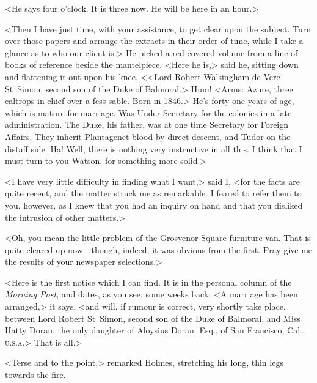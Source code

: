 <He says four o'clock. It is three now. He will be here in an hour.>

<Then I have just time, with your assistance, to get clear upon the subject. Turn over those papers and arrange the extracts in their order of time, while I take a glance as to who our client is.> He picked a red-covered volume from a line of books of reference beside the mantelpiece. <Here he is,> said he, sitting down and flattening it out upon his knee. <<Lord Robert Walsingham de Vere St~Simon, second son of the Duke of Balmoral.> Hum! <Arms: Azure, three caltrops in chief over a fess sable. Born in 1846.> He's forty-one years of age, which is mature for marriage. Was Under-Secretary for the colonies in a late administration. The Duke, his father, was at one time Secretary for Foreign Affairs. They inherit Plantagenet blood by direct descent, and Tudor on the distaff side. Ha! Well, there is nothing very instructive in all this. I think that I must turn to you Watson, for something more solid.>

<I have very little difficulty in finding what I want,> said I, <for the facts are quite recent, and the matter struck me as remarkable. I feared to refer them to you, however, as I knew that you had an inquiry on hand and that you disliked the intrusion of other matters.>

<Oh, you mean the little problem of the Grosvenor Square furniture van. That is quite cleared up now—though, indeed, it was obvious from the first. Pray give me the results of your newspaper selections.>

<Here is the first notice which I can find. It is in the personal column of the \textit{Morning Post}, and dates, as you see, some weeks back: <A marriage has been arranged,> it says, <and will, if rumour is correct, very shortly take place, between Lord Robert St~Simon, second son of the Duke of Balmoral, and Miss Hatty Doran, the only daughter of Aloysius Doran. Esq., of San Francisco, Cal., \textsc{u.s.a.}> That is all.>

<Terse and to the point,> remarked Holmes, stretching his long, thin legs towards the fire.

